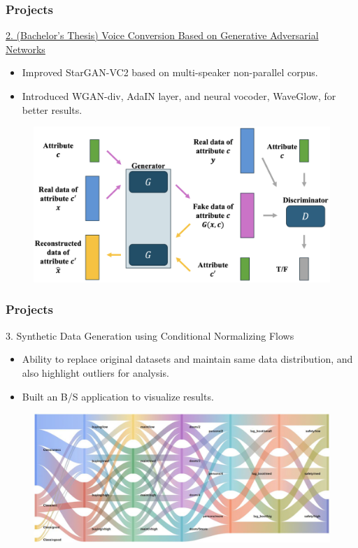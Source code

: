 \documentclass{beamer}
\begin{document}
\begin{frame}
    \frametitle{Projects}
    \begin{block}{\href{https://drive.google.com/file/d/1QqgPoRGhaSeS0QWrjnR8mxhvV_onwZ5y/view?usp=drive_link}{2. (Bachelor's Thesis) Voice Conversion Based on Generative Adversarial Networks}}
        \begin{itemize}
            \item Improved StarGAN-VC2 based on multi-speaker non-parallel corpus.
            \item Introduced WGAN-div, AdaIN layer, and neural vocoder, WaveGlow, for better results.
        \end{itemize}

        \begin{figure}[H]
            \centering
            \includegraphics[scale=0.15]{img/undergraduate-thesis-arch.png}
        \end{figure}
    \end{block}
\end{frame}

\begin{frame}
    \frametitle{Projects}
    \begin{block}{3. Synthetic Data Generation using Conditional Normalizing Flows}
        \begin{itemize}
            \item Ability to replace original datasets and maintain same data distribution, and also highlight outliers for analysis.
            \item Built an B/S application to visualize results.
        \end{itemize}

        \begin{figure}[H]
            \centering
            \includegraphics[scale=0.25]{img/cnf.png}
        \end{figure}
    \end{block}
\end{frame}
\end{document}
